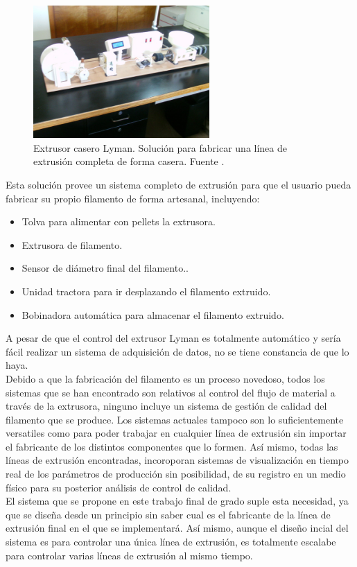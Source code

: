 \begin{figure}[h!]
    \centering
    \includegraphics[width=0.6\textwidth]{images/lyman.jpg}
    \caption[Extrusor casero Lyman.]{Extrusor casero Lyman. Solución para fabricar una línea de extrusión completa de forma casera. Fuente \cite{lyman}.}
    \label{fig:extr_lyman}
\end{figure}

Esta solución provee un sistema completo de extrusión para que el usuario pueda fabricar su propio filamento de forma artesanal, incluyendo:

\begin{itemize}
    \item{Tolva para alimentar con pellets la extrusora.}
    \item{Extrusora de filamento.}
    \item{Sensor de diámetro final del filamento..}
    \item{Unidad tractora para ir desplazando el filamento extruido.}
    \item{Bobinadora automática para almacenar el filamento extruido.}
\end{itemize}

A pesar de que el control del extrusor Lyman es totalmente automático y sería fácil realizar un sistema de adquisición de datos, no se tiene constancia de que lo haya.\\

Debido a que la fabricación del filamento es un proceso novedoso, todos los sistemas que se han encontrado son relativos al control del flujo de material a través de la extrusora, ninguno incluye un sistema de gestión de calidad del filamento que se produce. Los sistemas actuales tampoco son lo suficientemente versatiles como para poder trabajar en cualquier línea de extrusión sin importar el fabricante de los distintos componentes que lo formen. Así mismo, todas las líneas de extrusión encontradas, incoroporan sistemas de visualización en tiempo real de los parámetros de producción sin posibilidad, de su registro en un medio físico para su posterior análisis de control de calidad.\\

El sistema que se propone en este trabajo final de grado suple esta necesidad, ya que se diseña desde un principio sin saber cual es el fabricante de la línea de extrusión final en el que se implementará. Así mismo, aunque el diseño incial del sistema es para controlar una única línea de extrusión, es totalmente escalabe para controlar varias líneas de extrusión al mismo tiempo.\\

